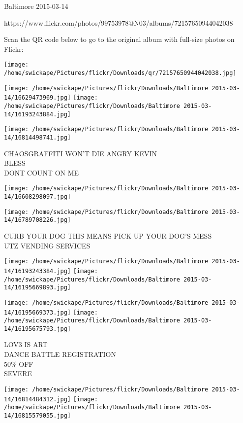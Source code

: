 \documentclass[10pt,letterpaper]{article}
\begin{document}
Baltimore 2015-03-14

https://www.flickr.com/photos/99753978@N03/albums/72157650944042038

Scan the QR code below to go to the original album with full-size photos on Flickr:

\texttt{[image: /home/swickape/Pictures/flickr/Downloads/qr/72157650944042038.jpg]}
\pagebreak

\texttt{[image: /home/swickape/Pictures/flickr/Downloads/Baltimore 2015-03-14/16629473969.jpg]}
\texttt{[image: /home/swickape/Pictures/flickr/Downloads/Baltimore 2015-03-14/16193243884.jpg]}

\vspace{0.25in}
\texttt{[image: /home/swickape/Pictures/flickr/Downloads/Baltimore 2015-03-14/16814498741.jpg]}

CHAOSGRAFFITI WON'T DIE ANGRY KEVIN\\
BLESS\\
DONT COUNT ON ME
\pagebreak

\texttt{[image: /home/swickape/Pictures/flickr/Downloads/Baltimore 2015-03-14/16608298097.jpg]}

\vspace{0.25in}
\texttt{[image: /home/swickape/Pictures/flickr/Downloads/Baltimore 2015-03-14/16789708226.jpg]}

CURB YOUR DOG THIS MEANS PICK UP YOUR DOG'S MESS\\
UTZ VENDING SERVICES
\pagebreak

\texttt{[image: /home/swickape/Pictures/flickr/Downloads/Baltimore 2015-03-14/16193243384.jpg]}
\texttt{[image: /home/swickape/Pictures/flickr/Downloads/Baltimore 2015-03-14/16195669893.jpg]}

\texttt{[image: /home/swickape/Pictures/flickr/Downloads/Baltimore 2015-03-14/16195669373.jpg]}
\texttt{[image: /home/swickape/Pictures/flickr/Downloads/Baltimore 2015-03-14/16195675793.jpg]}

LOV3 IS ART\\
DANCE BATTLE REGISTRATION\\
50\% OFF\\
SEVERE
\pagebreak

\texttt{[image: /home/swickape/Pictures/flickr/Downloads/Baltimore 2015-03-14/16814484312.jpg]}
\texttt{[image: /home/swickape/Pictures/flickr/Downloads/Baltimore 2015-03-14/16815579055.jpg]}
\end{document}
